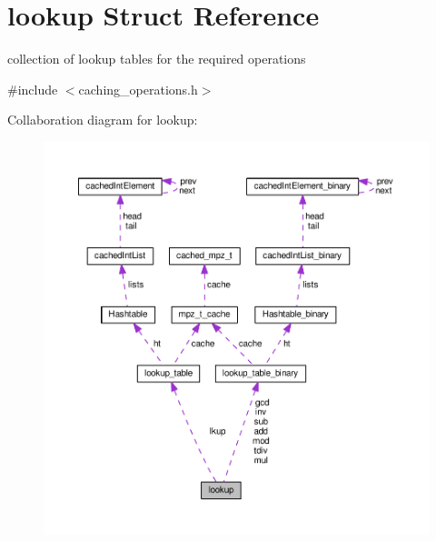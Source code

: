 \hypertarget{structlookup}{}\section{lookup Struct Reference}
\label{structlookup}


collection of lookup tables for the required operations  




{\ttfamily \#include $<$caching\+\_\+operations.\+h$>$}



Collaboration diagram for lookup\+:\nopagebreak
\begin{figure}[H]
\begin{center}
\leavevmode
\includegraphics[width=350pt]{structlookup__coll__graph}
\end{center}
\end{figure}
